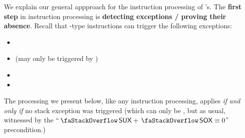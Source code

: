 We explain our general appproach for the instruction processing of 's.
The \textbf{first step} in instruction processing is \textbf{detecting exceptions / proving their absence}.
Recall that -type instructions can trigger the following exceptions:
\begin{itemize}
	\item \suxSH{}
	\item \staticxSH{} (may only be triggered by )
	\item \mxpxSH{}
	\item \oogxSH{}
\end{itemize}
The processing we present below, like any instruction processing, applies \emph{if and only if}
no stack exception was triggered (which can only be \suxSH{}, but as usual, witnessed by the ``$\stackSux + \stackSox \equiv 0$'' precondition.)

